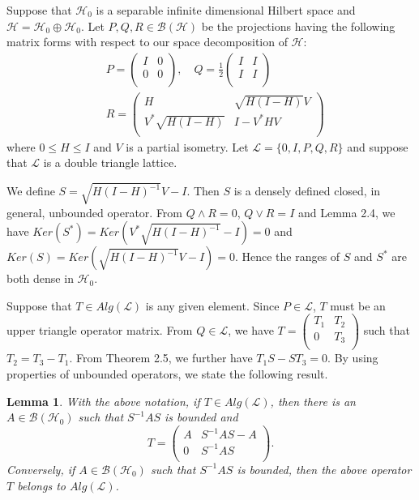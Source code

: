 \documentclass{jaums}
\theoremstyle{thmit} %
\newtheorem{lemma}[theorem]{Lemma}
\theoremstyle{thmrm} %
\begin{document}
Suppose that $\mathcal{H}_0$ is a separable infinite dimensional Hilbert space
and $\mathcal{H}=\mathcal{H}_0\oplus\mathcal{H}_0$.
Let $P, Q, R\in\mathcal{B}(\mathcal{H})$ be the projections having the following
matrix forms with respect to our space decomposition of $\mathcal H$:
\begin{align*}
&P=\left(
      \begin{array}{cc}
        I &     0  \\
        0 &     0  \\
      \end{array}
    \right), \quad Q=\frac{1}{2}\left(
      \begin{array}{cc}
        I &   I  \\
        I &   I  \\
      \end{array}
    \right)\\
    &R=\left(
      \begin{array}{cc}
        H                    & \sqrt{H(I-H)}V   \\
        V^{*}\sqrt{H(I-H)}   & I-V^{*}HV      \\
      \end{array}
    \right)
\end{align*}
where $0\leqslant H\leqslant I$ and $V$ is a partial isometry. Let
$\mathcal{L}=\{0,I,P,Q,R\}$ and suppose that $\mathcal{L}$ is a double triangle
lattice.


We define $S=\sqrt{H(I-H)^{-1}}V-I$. Then $S$ is a densely defined closed, in
general, unbounded operator.
From $Q\wedge R=0$, $Q\vee R=I$ and Lemma 2.4, we have
$Ker(S^*)=Ker(V^*\sqrt{H(I-H)^{-1}}-I)=0$
and $Ker(S)=Ker(\sqrt{H(I-H)^{-1}}V-I)=0$. Hence the ranges of $S$ and $S^*$ are
both dense in $\mathcal{H}_0$.

Suppose that $T\in Alg(\mathcal{L})$ is any given element. Since
$P\in\mathcal{L}$, $T$ must be an upper triangle operator matrix. From
$Q\in\mathcal{L}$, we have
$T=\left(
\begin{array}{cc}
 T_1 & T_2 \\
  0   & T_3 \\
   \end{array}
   \right)$
such that $T_2=T_3-T_1$. From Theorem 2.5,
we further have $T_1S-ST_3=0$. By using properties of unbounded operators, we
state the following result.


\begin{lemma} With the above notation, if $T\in Alg(\mathcal{L})$,
then there is an $A \in \mathcal{B}(\mathcal{H}_0)$ such that $S^{-1}AS$ is
bounded and
$$T =\left(
      \begin{array}{cc}
        A   &    S^{-1}AS-A  \\
        0   &    S^{-1}AS    \\
      \end{array}
    \right).
$$
Conversely, if $A\in \mathcal{B}(\mathcal{H}_0)$ such that $S^{-1}AS$ is
bounded, then the above operator $T$ belongs to $Alg(\mathcal{L})$.
\end{lemma}
\end{document}
